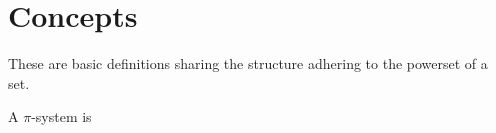 \section{Concepts}

These are basic definitions sharing the structure adhering to the powerset of a set.

\begin{definition}
  A \(\pi\)-system is
\end{definition}